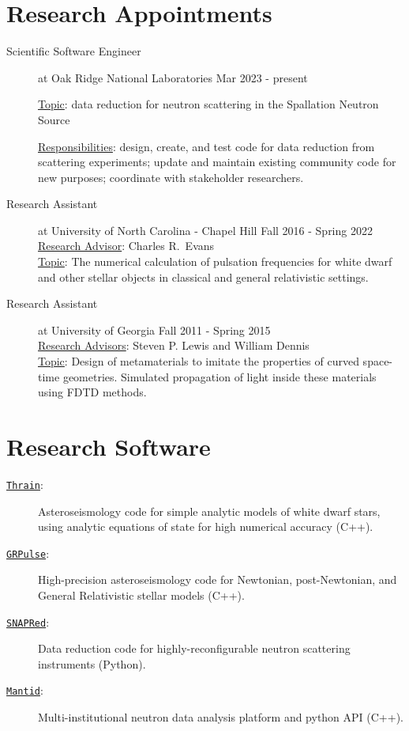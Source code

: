 \documentclass[11pt]{article}
\begin{document}
\section*{Research Appointments}
\begin{minipage}{\textwidth}
	\begin{description}
		\item[Scientific Software Engineer] at Oak Ridge National Laboratories \hfill Mar 2023 - present\\
		\rule{0pt}{12pt}\underline{Topic}: 
			data reduction for neutron scattering in the Spallation Neutron Source
		\\
		\rule{0pt}{12pt}\underline{Responsibilities}: 
			design, create, and test code for data reduction from scattering experiments;
			update and maintain existing community code for new purposes;
			coordinate with stakeholder researchers.	
		\item[Research Assistant] at University of North Carolina - Chapel Hill \hfill Fall 2016 - Spring 2022\\
		\underline{Research Advisor}: Charles R.~Evans\\
		\underline{Topic}: The numerical calculation of pulsation frequencies for white dwarf and other stellar objects in classical and general relativistic settings.
		\item[Research Assistant] at University of Georgia \hfill Fall 2011 - Spring 2015\\
		\underline{Research Advisors}:  Steven P. Lewis and William Dennis\\
		\underline{Topic}:  Design of metamaterials to imitate the properties of curved space-time geometries.  Simulated propagation of light inside these materials using FDTD methods.
	\end{description}
\end{minipage}

\section*{Research Software}
\begin{description}
	\item[\href{https://github.com/rboston628/thrain}{\tt Thrain}:] Asteroseismology code for simple analytic models of white dwarf stars, using analytic equations of state for high numerical accuracy (C++).
	\item[\href{https://github.com/rboston628/grpulse}{\tt GRPulse}:] High-precision asteroseismology code for Newtonian, post-Newtonian, and General Relativistic stellar models (C++).
	\item[\href{https://github.com/neutrons/SNAPRed}{\tt SNAPRed}:] Data reduction code for highly-reconfigurable neutron scattering instruments (Python).
	\item[\href{https://github.com/mantidproject/mantid}{\tt Mantid}:] Multi-institutional neutron data analysis platform and python API (C++).
\end{description}
\end{document}
